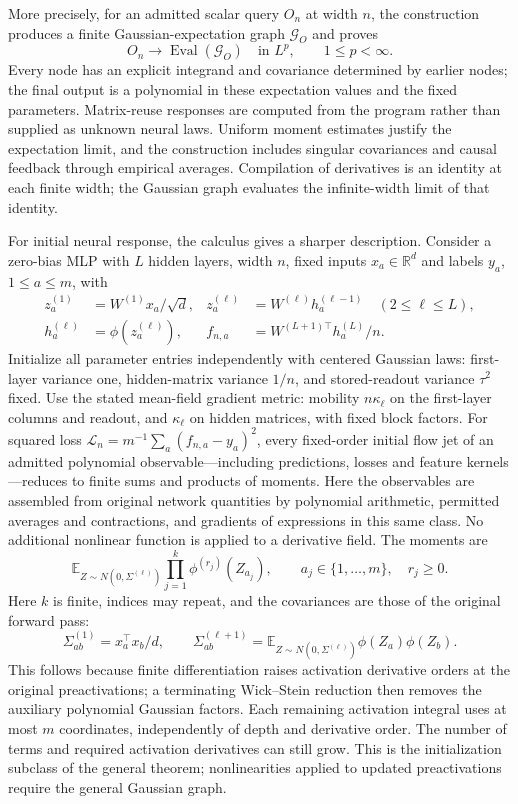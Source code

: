 More precisely, for an admitted scalar query $O_n$ at width $n$, the construction
produces a finite Gaussian-expectation graph $\mathcal G_O$ and proves
\[
 O_n\longrightarrow\operatorname{Eval}(\mathcal G_O)
 \quad\text{in }L^p,\qquad 1\le p<\infty.
\]
Every node has an explicit integrand and covariance determined by earlier
nodes; the final output is a polynomial in these expectation values and the
fixed parameters. Matrix-reuse responses are computed from the program rather
than supplied as unknown neural laws. Uniform moment estimates justify the
expectation limit, and the construction includes singular covariances and
causal feedback through empirical averages. Compilation of derivatives is an
identity at each finite width; the Gaussian graph evaluates the infinite-width
limit of that identity.

For initial neural response, the calculus gives a sharper description. Consider
a zero-bias MLP with $L$ hidden layers, width $n$, fixed inputs $x_a\in\mathbb R^d$
and labels $y_a$, $1\le a\le m$, with
\[
 \begin{aligned}
 z_a^{(1)}&=W^{(1)}x_a/\sqrt d,&
 z_a^{(\ell)}&=W^{(\ell)}h_a^{(\ell-1)}\quad(2\le\ell\le L),\\
 h_a^{(\ell)}&=\phi(z_a^{(\ell)}),&
 f_{n,a}&=W^{(L+1)\top}h_a^{(L)}/n.
 \end{aligned}
\]
Initialize all parameter entries independently with centered Gaussian laws:
first-layer variance one, hidden-matrix variance $1/n$, and stored-readout
variance $\tau^2$ fixed. Use the stated mean-field gradient metric: mobility
$n\kappa_\ell$ on the first-layer columns and readout, and $\kappa_\ell$ on
hidden matrices, with fixed block factors. For squared loss
$\mathcal L_n=m^{-1}\sum_a(f_{n,a}-y_a)^2$, every fixed-order
initial flow jet of an admitted polynomial observable---including predictions,
losses and feature kernels---reduces to finite sums and products of moments.
Here the observables are assembled from original network quantities by
polynomial arithmetic, permitted averages and contractions, and gradients of
expressions in this same class. No additional nonlinear function is applied to
a derivative field. The moments are
\[
 \mathbb E_{Z\sim N(0,\Sigma^{(\ell)})}
       \prod_{j=1}^{k}\phi^{(r_j)}(Z_{a_j}),
 \qquad a_j\in\{1,\ldots,m\},\quad r_j\ge0.
\]
Here $k$ is finite, indices may repeat, and the covariances are those of the
original forward pass:
\[
 \Sigma^{(1)}_{ab}=x_a^\top x_b/d,\qquad
 \Sigma^{(\ell+1)}_{ab}
 =\mathbb E_{Z\sim N(0,\Sigma^{(\ell)})}\phi(Z_a)\phi(Z_b).
\]
This follows because finite differentiation raises activation derivative orders
at the original preactivations; a terminating Wick--Stein reduction then removes
the auxiliary polynomial Gaussian factors. Each remaining activation integral
uses at most $m$ coordinates, independently of depth and derivative order.
The number of terms and required activation derivatives can still grow.
This is the initialization subclass of the general theorem; nonlinearities
applied to updated preactivations require the general Gaussian graph.

